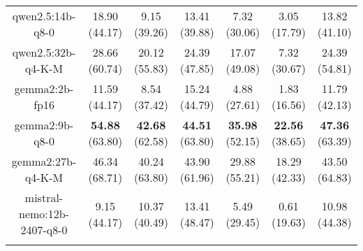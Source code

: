 \begin{table}[hbp]
{\begin{tabular}{ccccccc}
        \multicolumn{1}{c|}{qwen2.5:14b-q8-0} & 18.90 (44.17) & 9.15 (39.26) & \multicolumn{1}{c|}{13.41 (39.88)} & 7.32 (30.06) & \multicolumn{1}{c|}{3.05 (17.79)} & 13.82 (41.10) \\
        

        \multicolumn{1}{c|}{qwen2.5:32b-q4-K-M} & 28.66 (60.74) & 20.12 (55.83) & \multicolumn{1}{c|}{24.39 (47.85)} & 17.07 (49.08) & \multicolumn{1}{c|}{7.32 (30.67)} & 24.39 (54.81) \\
        

        \multicolumn{1}{c|}{gemma2:2b-fp16} & 11.59 (44.17) & 8.54 (37.42) & \multicolumn{1}{c|}{15.24 (44.79)} & 4.88 (27.61) & \multicolumn{1}{c|}{1.83 (16.56)} & 11.79 (42.13) \\
        

        \multicolumn{1}{c|}{gemma2:9b-q8-0} & \textbf{54.88} (63.80) & \textbf{42.68} (62.58) & \multicolumn{1}{c|}{\textbf{44.51} (63.80)} & \textbf{35.98} (52.15) & \multicolumn{1}{c|}{\textbf{22.56} (38.65)} & \textbf{47.36} (63.39) \\
        

        \multicolumn{1}{c|}{gemma2:27b-q4-K-M} & 46.34 (68.71) & 40.24 (63.80) & \multicolumn{1}{c|}{43.90 (61.96)} & 29.88 (55.21) & \multicolumn{1}{c|}{18.29 (42.33)} & 43.50 (64.83) \\
        

        \multicolumn{1}{c|}{mistral-nemo:12b-2407-q8-0} & 9.15 (44.17) & 10.37 (40.49) & \multicolumn{1}{c|}{13.41 (48.47)} & 5.49 (29.45) & \multicolumn{1}{c|}{0.61 (19.63)} & 10.98 (44.38) \\
        
\\ \hline
\end{tabular}%
}
\end{table}
    